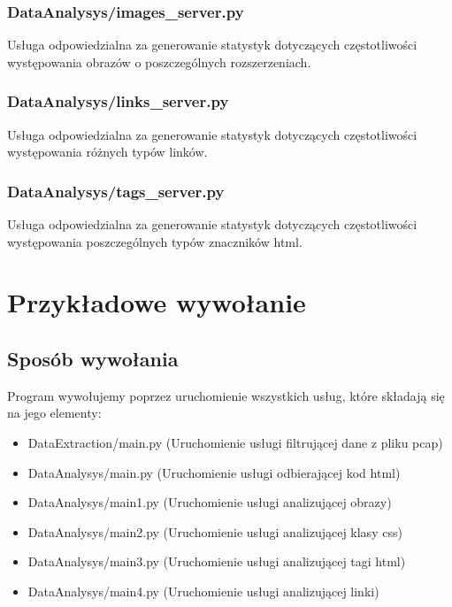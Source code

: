\documentclass[12pt]{article}
\begin{document}
\subsubsection{DataAnalysys/images\_server.py} 
Usługa odpowiedzialna za generowanie statystyk dotyczących częstotliwości występowania obrazów o poszczególnych rozszerzeniach.

\subsubsection{DataAnalysys/links\_server.py} 
Usługa odpowiedzialna za generowanie statystyk dotyczących częstotliwości występowania różnych typów linków.

\subsubsection{DataAnalysys/tags\_server.py} 
Usługa odpowiedzialna za generowanie statystyk dotyczących częstotliwości występowania poszczególnych typów znaczników html.


\section{Przykładowe wywołanie}
\subsection{Sposób wywołania}
Program wywołujemy poprzez uruchomienie wszystkich usług, które składają się na jego elementy:
\begin{itemize}
\item DataExtraction/main.py (Uruchomienie usługi filtrującej dane z pliku pcap)
\item DataAnalysys/main.py (Uruchomienie usługi odbierającej kod html)
\item DataAnalysys/main1.py (Uruchomienie usługi analizującej obrazy)
\item DataAnalysys/main2.py (Uruchomienie usługi analizującej klasy css)
\item DataAnalysys/main3.py (Uruchomienie usługi analizującej tagi html)
\item DataAnalysys/main4.py (Uruchomienie usługi analizującej linki)
\end{itemize}
\end{document}
